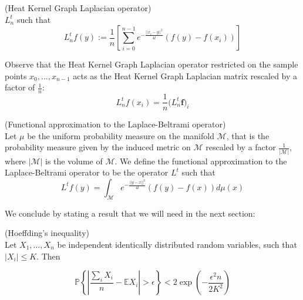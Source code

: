 \vspace{0.5cm}
\begin{definition}{}(Heat Kernel Graph Laplacian operator)\\
	\label{def:Heat Kernel Graph Laplacian operator}
	$L_n^t$ such that
	$$L_n^tf(y) := \frac{1}{n}\left[ \sum_{i=0}^{n-1} e^{-\frac{||x_i-y||^2}{4t}}\left(f(y)-f(x_i)\right)\right]$$
\end{definition}
\vspace{0.5cm}
Observe that the Heat Kernel Graph Laplacian operator restricted on the sample points $x_0, ..., x_{n-1}$ acts as the Heat Kernel Graph Laplacian matrix rescaled by a factor of $\frac{1}{n}$:
$$L_n^tf(x_i) = \frac{1}{n}\mathbf (L_n^t\mathbf f)_i$$
\vspace{0.5cm}
\begin{definition}{}(Functional approximation to the Laplace-Beltrami operator)\\ \label{eq: my L^t} Let $\mu$ be the uniform probability measure on the manifold $\mathcal M$, that is the probability measure given by the induced metric on $\mathcal M$ rescaled by a factor $\frac{1}{|\mathcal M|}$, where $|\mathcal M|$ is the volume of $\mathcal M$. We define the functional approximation to the Laplace-Beltrami operator to be the operator $L^t$ such that
	\label{def:Functional approximation to the Laplace-Beltrami operator}
	$$ L^tf(y) = \int_{\mathcal M}e^{-\frac{||y-x||^2}{4t}}\left(f(y)-f(x)\right)d\mu(x)$$
\end{definition}
\vspace{0.5cm}
We conclude by stating a result that we will need in the next section:
\vspace{0.5cm}
\begin{prop}(Hoeffding's inequality)\\
	Let \(X_{1}, \ldots, X_{n}\) be independent identically distributed random variables, such that
	\(\left|X_{i}\right| \leqslant K .\) Then
	
	$$
	\mathbb P\left\{\left|\frac{\sum_{i} X_{i}}{n}-\mathbb{E} X_{i}\right|>\epsilon\right\}<2 \exp \left(-\frac{\epsilon^{2} n}{2 K^{2}}\right)
	$$
	\label{theo:Hoeffding}
\end{prop}
